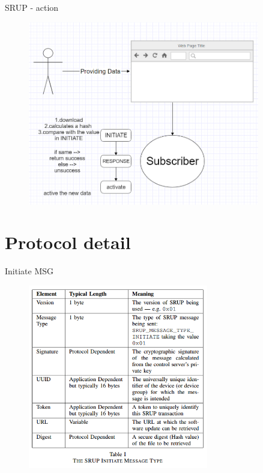 \documentclass{beamer}
\begin{document}
\begin{frame}{SRUP - action}
    \begin{figure}[t]
        \centering
        \includegraphics[width=0.9\textwidth]{figures/SRUP2.png}
    \end{figure}
\end{frame}

\section{Protocol detail}

\begin{frame}{Initiate MSG}
    \begin{figure}[t]
        \centering
        \includegraphics[width=0.7\textwidth]{figures/table1.png}
    \end{figure}
\end{frame}
\end{document}
